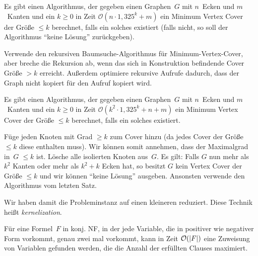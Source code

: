 \documentclass{cheat-sheet}
\newcommand{\size}[1]{\abs{#1}} %
\renewcommand{\O}{\mathcal{O}} %
\begin{document}

\begin{satz}
  Es gibt einen Algorithmus, der gegeben einen Graphen~$G$ mit $n$~Ecken und $m$~Kanten und ein $k \geq 0$ in Zeit $\O(n \cdot 1,325^{k} + m)$ ein Minimum Vertex Cover der Größe $\leq k$ berechnet, falls ein solches existiert (falls nicht, so soll der Algorithmus "`keine Lösung"' zurückgeben).
\end{satz}

\begin{idee}
  Verwende den rekursiven Baumsuche-Algorithmus für Minimum-Vertex-Cover, aber breche die Rekursion ab, wenn das sich in Konstruktion befindende Cover Größe $> k$ erreicht.
  Außerdem optimiere rekursive Aufrufe dadurch, dass der Graph nicht kopiert für den Aufruf kopiert wird.
\end{idee}

\begin{satz}
  Es gibt einen Algorithmus, der gegeben einen Graphen~$G$ mit $n$~Ecken und $m$~Kanten und ein $k \geq 0$ in Zeit $\O(k^2 \cdot 1,325^{k} + n + m)$ ein Minimum Vertex Cover der Größe $\leq k$ berechnet, falls ein solches existiert.
\end{satz}

\begin{idee}
  Füge jeden Knoten mit Grad $\geq k$ zum Cover hinzu (da jedes Cover der Größe $\leq k$ diese enthalten muss).
  Wir können somit annehmen, dass der Maximalgrad in~$G$ $\leq k$ ist.
  Lösche alle isolierten Knoten aus~$G$.
  Es gilt: Falls $G$ nun mehr als $k^2$ Kanten oder mehr als $k^2 + k$ Ecken hat, so besitzt $G$ kein Vertex Cover der Größe $\leq k$ und wir können "`keine Lösung"' ausgeben.
  Ansonsten verwende den Algorithmus vom letzten Satz.
\end{idee}

\begin{bem}
  Wir haben damit die Probleminstanz auf einen kleineren  reduziert.
  Diese Technik heißt \textit{kernelization}.
\end{bem}



\begin{lem}
  Für eine Formel~$F$ in konj. NF, in der jede Variable, die in positiver wie negativer Form vorkommt, genau zwei mal vorkommt, kann in Zeit $\O(\size{F})$ eine Zuweisung von Variablen gefunden werden, die die Anzahl der erfüllten Clauses maximiert.
\end{lem}
\end{document}

